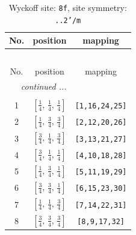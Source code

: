 \documentclass[fleqn,8pt]{jsarticle}
\begin{document}
\begin{longtable}{ccc}
\caption{Wyckoff site: {\tt 8f}, site symmetry: {\tt ..2'/m}}
 \\
 \hline \hline
No. & position & mapping \\ \hline \endfirsthead

\multicolumn{2}{l}{\tablename\ \thetable{}} \\
 \hline \hline
No. & position & mapping \\ \hline \endhead

 \hline \hline
\multicolumn{2}{r}{\footnotesize\it continued ...} \\ \endfoot

 \hline \hline
\multicolumn{2}{r}{} \\ \endlastfoot

1 & $\left[ \frac{1}{4},\, \frac{1}{4},\, \frac{1}{4} \right]$ & {\tt [1,16,24,25]} \\ \hline
2 & $\left[ \frac{1}{4},\, \frac{3}{4},\, \frac{3}{4} \right]$ & {\tt [2,12,20,26]} \\ \hline
3 & $\left[ \frac{3}{4},\, \frac{1}{4},\, \frac{3}{4} \right]$ & {\tt [3,13,21,27]} \\ \hline
4 & $\left[ \frac{3}{4},\, \frac{1}{4},\, \frac{1}{4} \right]$ & {\tt [4,10,18,28]} \\ \hline
5 & $\left[ \frac{1}{4},\, \frac{3}{4},\, \frac{1}{4} \right]$ & {\tt [5,11,19,29]} \\ \hline
6 & $\left[ \frac{3}{4},\, \frac{3}{4},\, \frac{1}{4} \right]$ & {\tt [6,15,23,30]} \\ \hline
7 & $\left[ \frac{1}{4},\, \frac{1}{4},\, \frac{3}{4} \right]$ & {\tt [7,14,22,31]} \\ \hline
8 & $\left[ \frac{3}{4},\, \frac{3}{4},\, \frac{3}{4} \right]$ & {\tt [8,9,17,32]} \\
\end{longtable}
\renewcommand{\arraystretch}{1.2}
\end{document}

